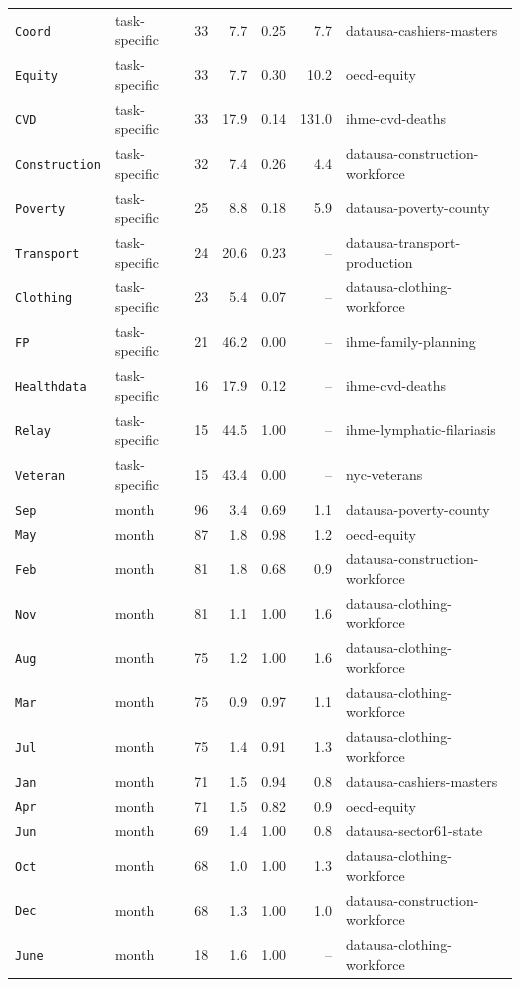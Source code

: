 \begin{tabular}{llrrrrl}
\texttt{Coord} & task-specific & 33 & 7.7 & 0.25 & 7.7 & datausa-cashiers-masters \\
\texttt{Equity} & task-specific & 33 & 7.7 & 0.30 & 10.2 & oecd-equity \\
\texttt{CVD} & task-specific & 33 & 17.9 & 0.14 & 131.0 & ihme-cvd-deaths \\
\texttt{Construction} & task-specific & 32 & 7.4 & 0.26 & 4.4 & datausa-construction-workforce \\
\texttt{Poverty} & task-specific & 25 & 8.8 & 0.18 & 5.9 & datausa-poverty-county \\
\texttt{Transport} & task-specific & 24 & 20.6 & 0.23 & -- & datausa-transport-production \\
\texttt{Clothing} & task-specific & 23 & 5.4 & 0.07 & -- & datausa-clothing-workforce \\
\texttt{FP} & task-specific & 21 & 46.2 & 0.00 & -- & ihme-family-planning \\
\texttt{Healthdata} & task-specific & 16 & 17.9 & 0.12 & -- & ihme-cvd-deaths \\
\texttt{Relay} & task-specific & 15 & 44.5 & 1.00 & -- & ihme-lymphatic-filariasis \\
\texttt{Veteran} & task-specific & 15 & 43.4 & 0.00 & -- & nyc-veterans \\
\texttt{Sep} & month & 96 & 3.4 & 0.69 & 1.1 & datausa-poverty-county \\
\texttt{May} & month & 87 & 1.8 & 0.98 & 1.2 & oecd-equity \\
\texttt{Feb} & month & 81 & 1.8 & 0.68 & 0.9 & datausa-construction-workforce \\
\texttt{Nov} & month & 81 & 1.1 & 1.00 & 1.6 & datausa-clothing-workforce \\
\texttt{Aug} & month & 75 & 1.2 & 1.00 & 1.6 & datausa-clothing-workforce \\
\texttt{Mar} & month & 75 & 0.9 & 0.97 & 1.1 & datausa-clothing-workforce \\
\texttt{Jul} & month & 75 & 1.4 & 0.91 & 1.3 & datausa-clothing-workforce \\
\texttt{Jan} & month & 71 & 1.5 & 0.94 & 0.8 & datausa-cashiers-masters \\
\texttt{Apr} & month & 71 & 1.5 & 0.82 & 0.9 & oecd-equity \\
\texttt{Jun} & month & 69 & 1.4 & 1.00 & 0.8 & datausa-sector61-state \\
\texttt{Oct} & month & 68 & 1.0 & 1.00 & 1.3 & datausa-clothing-workforce \\
\texttt{Dec} & month & 68 & 1.3 & 1.00 & 1.0 & datausa-construction-workforce \\
\texttt{June} & month & 18 & 1.6 & 1.00 & -- & datausa-clothing-workforce \\
\bottomrule
\end{tabular}
